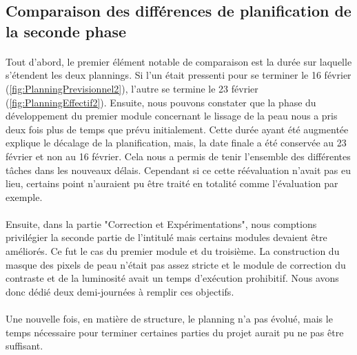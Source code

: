 \documentclass[11pt, french,screen]{report-rd-info}
\begin{document}
\subsection{Comparaison des différences de planification de la seconde phase}
\paragraph*{}
Tout d'abord, le premier élément notable de comparaison est la durée sur laquelle s'étendent les deux plannings. Si l'un était pressenti pour se terminer le 16 février (\ref{fig:PlanningPrevisionnel2}), l'autre se termine le 23 février (\ref{fig:PlanningEffectif2}). Ensuite, nous pouvons constater que la phase du développement du premier module concernant le lissage de la peau nous a pris deux fois plus de temps que prévu initialement. Cette durée ayant été augmentée explique le décalage de la planification, mais, la date finale a été conservée au 23 février et non au 16 février. Cela nous a permis de tenir l'ensemble des différentes tâches dans les nouveaux délais. Cependant si ce cette réévaluation n'avait pas eu lieu, certains point n'auraient pu être traité en totalité comme l'évaluation par exemple.
\paragraph*{}
Ensuite, dans la partie "Correction et Expérimentations", nous comptions privilégier la seconde partie de l'intitulé mais certains modules devaient être améliorés. Ce fut le cas du premier module et du troisième. La construction du masque des pixels de peau n'était pas assez stricte et le module de correction du contraste et de la luminosité avait un temps d'exécution prohibitif. Nous avons donc dédié deux demi-journées à remplir ces objectifs. 
\paragraph*{}
Une nouvelle fois, en matière de structure, le planning n'a pas évolué, mais le temps nécessaire pour terminer certaines parties du projet aurait pu ne pas être suffisant.
\end{document}
